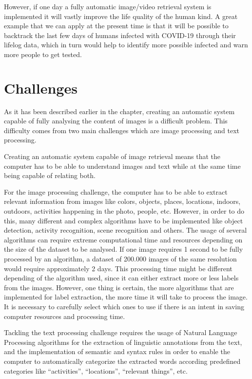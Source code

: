 However, if one day a fully automatic image/video retrieval system is implemented it will vastly improve the life quality of the human kind. A great example that we can apply at the present time is that it will be possible to backtrack the last few days of humans infected with COVID-19 through their lifelog data, which in turn would help to identify more possible infected and warn more people to get tested.

\section{Challenges}

As it has been described earlier in the chapter, creating an automatic system capable of fully analysing the content of images is a difficult problem. This difficulty comes from two main challenges which are image processing and text processing. 

Creating an automatic system capable of image retrieval means that the computer has to be able to understand images and text while at the same time being capable of relating both.

For the image processing challenge, the computer has to be able to extract relevant information from images like colors, objects, places, locations, indoors, outdoors, activities happening in the photo, people, etc. However, in order to do this, many different and complex algorithms have to be implemented like object detection, activity recognition, scene recognition and others. The usage of several algorithms can require extreme computational time and resources depending on the size of the dataset to be analysed. If one image requires 1 second to be fully processed by an algorithm, a dataset of 200.000 images of the same resolution would require approximately 2 days. This processing time might be different depending of the algorithm used, since it can either extract more or less labels from the images. However, one thing is certain, the more algorithms that are implemented for label extraction, the more time it will take to process the image. It is necessary to carefully select which ones to use if there is an intent in saving computer resources and processing time.

Tackling the text processing challenge requires the usage of Natural Language Processing algorithms for the extraction of  linguistic annotations from the text, and the implementation of semantic and syntax rules in order to enable the computer to automatically categorize the extracted words according predefined categories like ``activities”, ``locations”, ``relevant things”, etc. 


